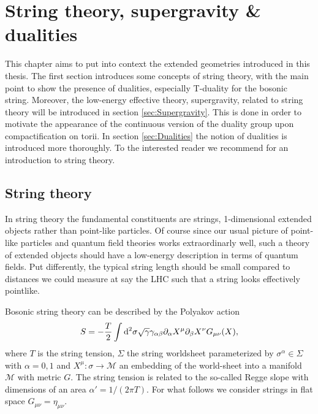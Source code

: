 \chapter{String theory, supergravity \& dualities\label{chap:StringTheory}}


This chapter aims to put into context the extended geometries introduced in this thesis. The first section introduces some concepts of string theory, with the main point to show the presence of dualities, especially T-duality for the bosonic string. Moreover, the low-energy effective theory, supergravity, related to string theory will be introduced in section \ref{sec:Supergravity}. This is done in order to motivate the appearance of the continuous version of the duality group upon compactification on torii. In section \ref{sec:Dualities} the notion of dualities is introduced more thoroughly. To the interested reader we recommend \cite{Blumenhagen2013,TongLectureNotes} for an introduction to string theory.


\section{String theory}
In string theory the fundamental constituents are strings, 1-dimensional extended objects rather than point-like particles. Of course since our usual picture of point-like particles and quantum field theories works extraordinarly well, such a theory of extended objects should have a low-energy description in terms of quantum fields. Put differently, the typical string length should be small compared to distances we could measure at say the LHC such that a string looks effectively pointlike. 

Bosonic string theory can be described by the Polyakov action
\begin{equation}
    S = -\frac{T}{2}\int \mathrm{d}^2\sigma \sqrt{\gamma}\gamma_{\alpha\beta}\partial_\alpha X^\mu\partial_\beta X^\nu G_{\mu\nu}(X),
\end{equation}
where $T$ is the string tension, $\Sigma$ the string worldsheet parameterized by $\sigma^{\alpha}\in\Sigma$ with $\alpha=0,1$ and $X^\mu: \sigma \to \mathcal{M}$  an embedding of the world-sheet into a manifold $\mathcal{M}$ with metric $G$. The string tension is related to the so-called Regge slope with dimensions of an area $\alpha'= 1/(2\pi T)$. For what follows we consider strings in flat space $G_{\mu\nu}=\eta_{\mu\nu}$. 

